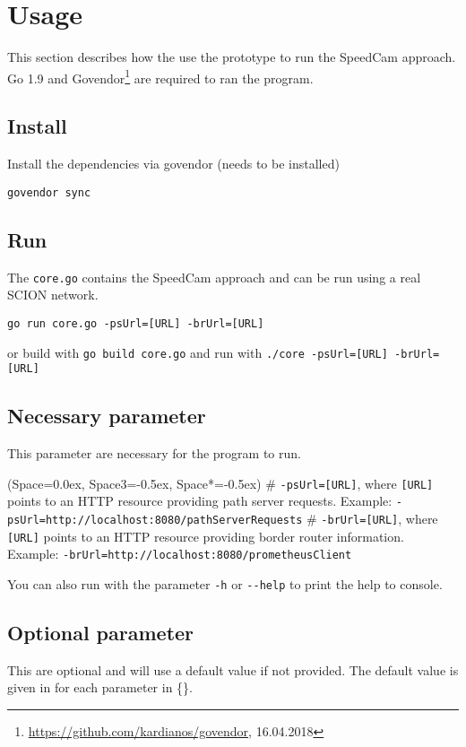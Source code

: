 \documentclass[thesis.tex]{subfiles}
\begin{document}
\newpage
\section{Usage} \label{app:usage}
This section describes how the use the prototype to run the SpeedCam approach. Go 1.9 and Govendor\footnote{\url{https://github.com/kardianos/govendor}, 16.04.2018} are required to ran the program.

\subsection*{Install}
Install the dependencies via govendor (needs to be installed)

{\lstinline|govendor sync|}

\subsection*{Run}
The {\lstinline|core.go|} contains the SpeedCam approach and can be run using a real SCION network.

{\lstinline|go run core.go -psUrl=[URL] -brUrl=[URL]|}

or build with {\lstinline|go build core.go|} and run with {\lstinline|./core -psUrl=[URL] -brUrl=[URL]|}
\subsection*{Necessary parameter}
This parameter are necessary for the program to run.

\begin{easylist}[itemize]
	\ListProperties(Space=0.0ex, Space3=-0.5ex, Space*=-0.5ex)
	# {\lstinline|-psUrl=[URL]|}, where {\lstinline|[URL]|} points to an HTTP resource providing path server requests. Example: {\lstinline|-psUrl=http://localhost:8080/pathServerRequests|}	
	# {\lstinline|-brUrl=[URL]|}, where {\lstinline|[URL]|} points to an HTTP resource providing border router information. Example: {\lstinline|-brUrl=http://localhost:8080/prometheusClient|}
\end{easylist}

You can also run with the parameter {\lstinline|-h|} or {\lstinline|--help|} to print the help to console.
\subsection*{Optional parameter}
This are optional and will use a default value if not provided. The default value is given in for each parameter in \{\}.
\end{document}
